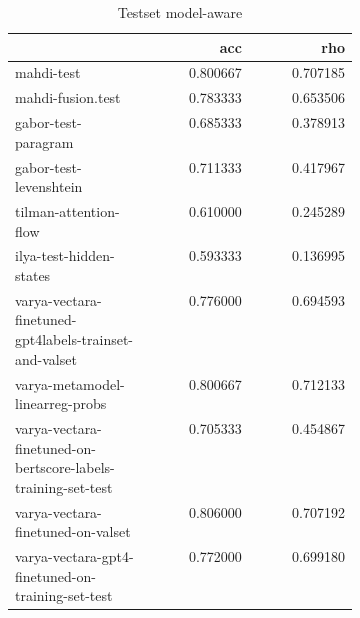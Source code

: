 \begin{table}
\caption{Testset model-aware}
\label{test-aware}
\begin{tabular}{|p{0.4\linewidth}|r|r|}
\hline
 & acc & rho \\
\hline
mahdi-test & 0.800667 & 0.707185 \\
\cline{1-3}
mahdi-fusion.test & 0.783333 & 0.653506 \\
\cline{1-3}
gabor-test-paragram & 0.685333 & 0.378913 \\
\cline{1-3}
gabor-test-levenshtein & 0.711333 & 0.417967 \\
\cline{1-3}
tilman-attention-flow & 0.610000 & 0.245289 \\
\cline{1-3}
ilya-test-hidden-states & 0.593333 & 0.136995 \\
\cline{1-3}
varya-vectara-finetuned-gpt4labels-trainset-and-valset & 0.776000 & 0.694593 \\
\cline{1-3}
varya-metamodel-linearreg-probs & 0.800667 & 0.712133 \\
\cline{1-3}
varya-vectara-finetuned-on-bertscore-labels-training-set-test & 0.705333 & 0.454867 \\
\cline{1-3}
varya-vectara-finetuned-on-valset & 0.806000 & 0.707192 \\
\cline{1-3}
varya-vectara-gpt4-finetuned-on-training-set-test & 0.772000 & 0.699180 \\
\cline{1-3}
\hline
\end{tabular}
\end{table}
